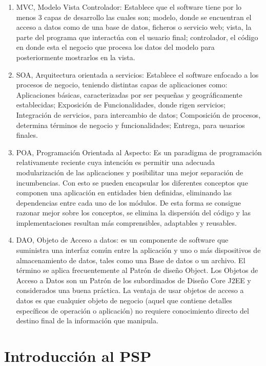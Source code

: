 \documentclass[a4paper,12pt,openany,oneside]{book}
\begin{document}
\begin{enumerate}

\item MVC, Modelo Vista Controlador: Establece que el software tiene por lo menos 3 capas de desarrollo las cuales son; modelo, donde se encuentran el acceso a datos como de una base de datos, ficheros o servicio web; vista, la parte del programa que interactúa con el usuario final; controlador, el código en donde esta el negocio que procesa los datos del modelo para posteriormente mostrarlos en la vista.

\item SOA, Arquitectura orientada a servicios: Establece el software enfocado a los procesos de negocio, teniendo distintas capas de aplicaciones como: Aplicaciones básicas, caracterizadas por ser pequeñas y geográficamente establecidas; Exposición de Funcionalidades, donde rigen servicios; Integración de servicios, para intercambio de datos; Composición de procesos, determina términos de negocio y funcionalidades; Entrega, para usuarios finales.

\item POA, Programación Orientada al Aspecto: Es un paradigma de programación relativamente reciente cuya intención es permitir una adecuada modularización de las aplicaciones y posibilitar una mejor separación de incumbencias. Con esto se pueden encapsular los diferentes conceptos que componen una aplicación en entidades bien definidas, eliminando las dependencias entre cada uno de los módulos. De esta forma se consigue razonar mejor sobre los conceptos, se elimina la dispersión del código y las implementaciones resultan más comprensibles, adaptables y reusables.

\item DAO, Objeto de Acceso a datos: es un componente de software que suministra una interfaz común entre la aplicación y uno o más dispositivos de almacenamiento de datos, tales como una Base de datos o un archivo. El término se aplica frecuentemente al Patrón de diseño Object. Los Objetos de Acceso a Datos son un Patrón de los subordinados de Diseño Core J2EE y considerados una buena práctica. La ventaja de usar objetos de acceso a datos es que cualquier objeto de negocio (aquel que contiene detalles específicos de operación o aplicación) no requiere conocimiento directo del destino final de la información que manipula.

\end{enumerate}

\chapter{Introducción al PSP}
\thispagestyle{empty}
\end{document}
